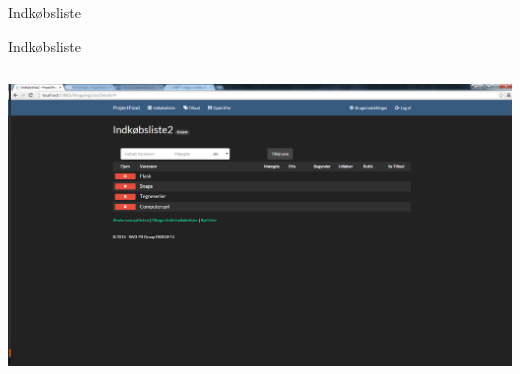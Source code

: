 \begin{frame}{Indkøbsliste}
\begin{minipage}[0.3\textheight]{\textwidth}
  \end{minipage}
	
\end{frame}

\begin{frame}{Indkøbsliste}

	
	\begin{minipage}[0.3\textheight]{\textwidth}
	\begin{columns}[T]
	\begin{column}{1\textwidth}
	 \includegraphics[width=1\textwidth,height=1\textheight,keepaspectratio, trim={1cm 0 0 16mm}, clip]{images/Screenshots/ShoppingListOld.png}
	
	\end{column}

	\end{columns}

  \end{minipage}
	
\end{frame}

